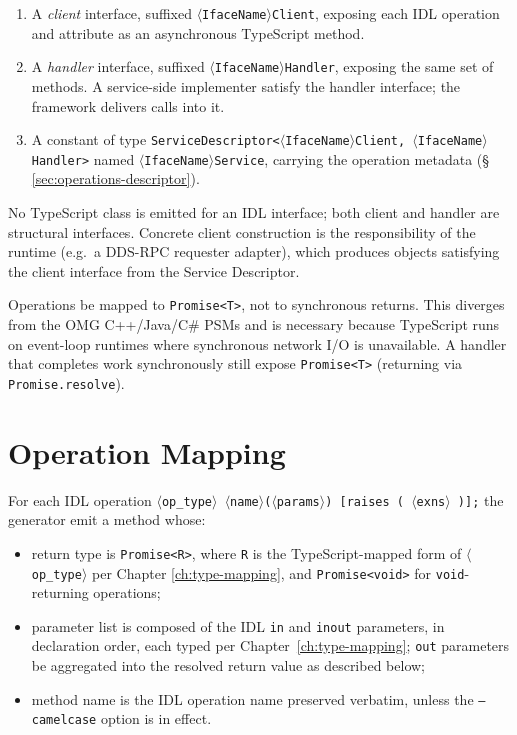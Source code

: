 \documentclass{../styles/zerodds-vendor-spec}
\begin{document}
\begin{enumerate}
  \item A \emph{client} interface, suffixed
        \texttt{$\langle$IfaceName$\rangle$Client}, exposing each
        IDL operation and attribute as an asynchronous TypeScript
        method.
  \item A \emph{handler} interface, suffixed
        \texttt{$\langle$IfaceName$\rangle$Handler}, exposing the
        same set of methods. A service-side implementer
         satisfy the handler interface; the framework
        delivers calls into it.
  \item A constant of type
        \texttt{ServiceDescriptor<$\langle$IfaceName$\rangle$Client,\,$\langle$IfaceName$\rangle$Handler>}
        named
        \texttt{$\langle$IfaceName$\rangle$Service},
        carrying the operation metadata
        (\S\,\ref{sec:operations-descriptor}).
\end{enumerate}

No TypeScript class is emitted for an IDL interface; both client
and handler are structural interfaces. Concrete client
construction is the responsibility of the runtime (e.g.\ a
DDS-RPC requester adapter), which produces objects satisfying the
client interface from the Service Descriptor.

Operations  be mapped to \texttt{Promise<T>}, not
to synchronous returns. This diverges from the OMG C++/Java/C\#
PSMs and is necessary because TypeScript runs on event-loop
runtimes where synchronous network I/O is unavailable. A
handler that completes work synchronously  still
expose \texttt{Promise<T>} (returning via
\texttt{Promise.resolve}).

\section{Operation Mapping}

For each IDL operation
\texttt{$\langle$op\_type$\rangle$ $\langle$name$\rangle$($\langle$params$\rangle$) [raises\,(\,$\langle$exns$\rangle$\,)];}
the generator  emit a method whose:

\begin{itemize}[noitemsep]
  \item return type is \texttt{Promise<R>}, where
        \texttt{R} is the TypeScript-mapped form of
        \texttt{$\langle$op\_type$\rangle$} per Chapter
        \ref{ch:type-mapping}, and \texttt{Promise<void>} for
        \texttt{void}-returning operations;
  \item parameter list is composed of the IDL \texttt{in} and
        \texttt{inout} parameters, in declaration order, each
        typed per Chapter~\ref{ch:type-mapping}; \texttt{out}
        parameters  be aggregated into the resolved
        return value as described below;
  \item method name is the IDL operation name preserved verbatim,
        unless the \texttt{--camelcase} option is in effect.
\end{itemize}
\end{document}
